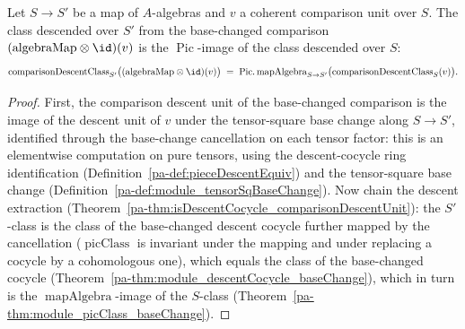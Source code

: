\begin{theorem}
  \label{pa-thm:comparisonDescentClass_mapAlgebra}
  \leanok

  Let \(S \to S'\) be a map of \(A\)-algebras and \(v\) a coherent comparison unit over \(S\). The
  class descended over \(S'\) from the base-changed comparison \((\mathrm{algebraMap} \otimes \id)(v)\)
  is the \(\operatorname{Pic}\)-image of the class descended over \(S\):
  \[
    \mathrm{comparisonDescentClass}_{S'}\bigl((\mathrm{algebraMap} \otimes \id)(v)\bigr)
      \;=\; \operatorname{Pic.mapAlgebra}_{S \to S'}\bigl(\mathrm{comparisonDescentClass}_S(v)\bigr).
  \]
\end{theorem}
\begin{proof}
  \leanok
  First, the comparison descent unit of the base-changed comparison is the image of the descent unit
  of \(v\) under the tensor-square base change along \(S \to S'\), identified through the
  base-change cancellation on each tensor factor: this is an elementwise computation on pure
  tensors, using the descent-cocycle ring identification (Definition~\ref{pa-def:pieceDescentEquiv}) and
  the tensor-square base change (Definition~\ref{pa-def:module_tensorSqBaseChange}). Now chain the
  descent extraction (Theorem~\ref{pa-thm:isDescentCocycle_comparisonDescentUnit}): the \(S'\)-class is
  the class of the base-changed descent cocycle further mapped by the cancellation
  (\(\operatorname{picClass}\) is invariant under the mapping and under replacing a cocycle by a
  cohomologous one), which equals the class of the base-changed cocycle
  (Theorem~\ref{pa-thm:module_descentCocycle_baseChange}), which in turn is the
  \(\operatorname{mapAlgebra}\)-image of the \(S\)-class
  (Theorem~\ref{pa-thm:module_picClass_baseChange}).
\end{proof}

